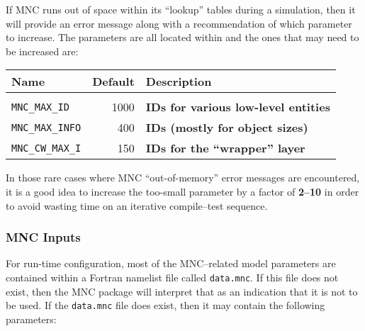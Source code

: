 If MNC runs out of space within its ``lookup'' tables during a
simulation, then it will provide an error message along with a
recommendation of which parameter to increase.  The parameters are all
located within 
and the ones that may need to be increased are:

\begin{center}
  {\footnotesize
    \begin{tabular}[htb]{|l|r|l|}\hline
      \textbf{Name}  &  
      \textbf{Default}  &  \textbf{Description}  \\\hline
      &  &  \\
      \texttt{MNC\_MAX\_ID}  &  1000  & 
      \textbf{IDs for various low-level entities}  \\
      \texttt{MNC\_MAX\_INFO}  &   400  & 
      \textbf{IDs (mostly for object sizes)}  \\
      \texttt{MNC\_CW\_MAX\_I}  &  150  & 
      \textbf{IDs for the ``wrapper'' layer}  \\\hline
    \end{tabular}
  }
\end{center}

In those rare cases where MNC ``out-of-memory'' error messages are
encountered, it is a good idea to increase the too-small parameter by
a factor of \textbf{2--10} in order to avoid wasting time on an
iterative compile--test sequence.


\subsubsection{MNC Inputs}

For run-time configuration, most of the MNC--related model parameters
are contained within a Fortran namelist file called \texttt{data.mnc}.
If this file does not exist, then the MNC package will interpret that
as an indication that it is not to be used.  If the \texttt{data.mnc}
file does exist, then it may contain the following parameters:

